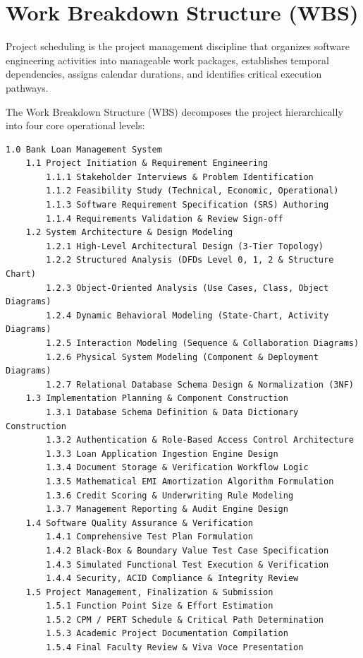 \documentclass[12pt,a4paper,oneside]{report}
\begin{document}
\section{Work Breakdown Structure (WBS)}

Project scheduling is the project management discipline that organizes software engineering activities into manageable work packages, establishes temporal dependencies, assigns calendar durations, and identifies critical execution pathways.

The Work Breakdown Structure (WBS) decomposes the project hierarchically into four core operational levels:

\begin{lstlisting}
1.0 Bank Loan Management System
    1.1 Project Initiation & Requirement Engineering
        1.1.1 Stakeholder Interviews & Problem Identification
        1.1.2 Feasibility Study (Technical, Economic, Operational)
        1.1.3 Software Requirement Specification (SRS) Authoring
        1.1.4 Requirements Validation & Review Sign-off
    1.2 System Architecture & Design Modeling
        1.2.1 High-Level Architectural Design (3-Tier Topology)
        1.2.2 Structured Analysis (DFDs Level 0, 1, 2 & Structure Chart)
        1.2.3 Object-Oriented Analysis (Use Cases, Class, Object Diagrams)
        1.2.4 Dynamic Behavioral Modeling (State-Chart, Activity Diagrams)
        1.2.5 Interaction Modeling (Sequence & Collaboration Diagrams)
        1.2.6 Physical System Modeling (Component & Deployment Diagrams)
        1.2.7 Relational Database Schema Design & Normalization (3NF)
    1.3 Implementation Planning & Component Construction
        1.3.1 Database Schema Definition & Data Dictionary Construction
        1.3.2 Authentication & Role-Based Access Control Architecture
        1.3.3 Loan Application Ingestion Engine Design
        1.3.4 Document Storage & Verification Workflow Logic
        1.3.5 Mathematical EMI Amortization Algorithm Formulation
        1.3.6 Credit Scoring & Underwriting Rule Modeling
        1.3.7 Management Reporting & Audit Engine Design
    1.4 Software Quality Assurance & Verification
        1.4.1 Comprehensive Test Plan Formulation
        1.4.2 Black-Box & Boundary Value Test Case Specification
        1.4.3 Simulated Functional Test Execution & Verification
        1.4.4 Security, ACID Compliance & Integrity Review
    1.5 Project Management, Finalization & Submission
        1.5.1 Function Point Size & Effort Estimation
        1.5.2 CPM / PERT Schedule & Critical Path Determination
        1.5.3 Academic Project Documentation Compilation
        1.5.4 Final Faculty Review & Viva Voce Presentation
\end{lstlisting}
\end{document}
